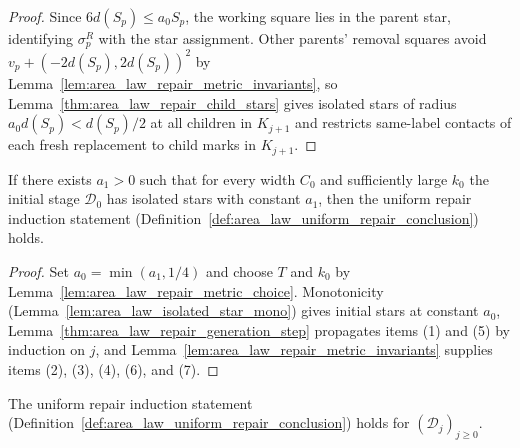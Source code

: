 \begin{proof}
    \leanok
    Since $6d(S_p)\le a_0S_p$, the working square lies in the parent star, identifying $\sigma_p^R$
    with the star assignment. Other parents' removal squares avoid $v_p+(-2d(S_p),2d(S_p))^2$ by
    Lemma~\ref{lem:area_law_repair_metric_invariants}, so Lemma~\ref{thm:area_law_repair_child_stars}
    gives isolated stars of radius $a_0d(S_p)<d(S_p)/2$ at all children in $K_{j+1}$ and restricts
    same-label contacts of each fresh replacement to child marks in $K_{j+1}$.
\end{proof}

\begin{lemma}
    \label{thm:area_law_uniform_repair_induction_conditional}
    \leanok
    If there exists $a_1>0$ such that for every width $C_0$ and sufficiently large $k_0$ the
    initial stage $\mathcal D_0$ has isolated stars with constant $a_1$, then the uniform repair
    induction statement (Definition~\ref{def:area_law_uniform_repair_conclusion}) holds.
\end{lemma}

\begin{proof}
    \leanok
    Set $a_0=\min(a_1,1/4)$ and choose $T$ and $k_0$ by Lemma~\ref{lem:area_law_repair_metric_choice}.
    Monotonicity (Lemma~\ref{lem:area_law_isolated_star_mono}) gives initial stars at constant $a_0$,
    Lemma~\ref{thm:area_law_repair_generation_step} propagates items (1) and (5) by induction on $j$,
    and Lemma~\ref{lem:area_law_repair_metric_invariants} supplies items (2), (3), (4), (6), and (7).
\end{proof}

\begin{lemma}
    \label{thm:area_law_uniform_repair_induction}
    \leanok
    The uniform repair induction statement (Definition~\ref{def:area_law_uniform_repair_conclusion})
    holds for $(\mathcal D_j)_{j\ge0}$.
\end{lemma}

